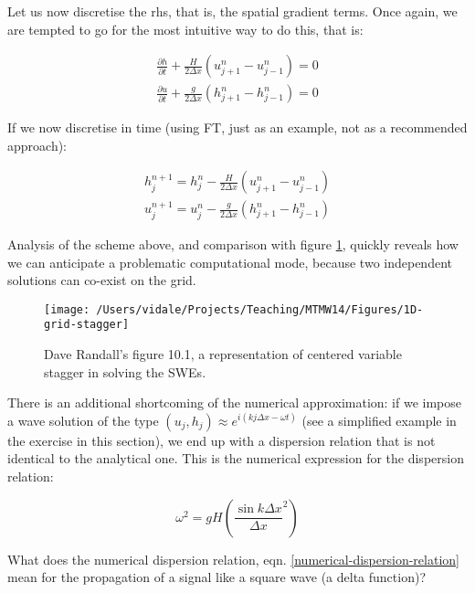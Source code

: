 Let us now discretise the rhs, that is, the spatial gradient terms. Once again, we are tempted to go for the most intuitive way to do this, that is:

\begin{eqnarray}
	\frac{\partial h}{\partial t} + \frac {H}{2 \Delta x} (u_{j+1}^n - u_{j-1}^n)= 0 \\
	\frac {\partial u}{\partial t} + \frac {g}{2 \Delta x} (h_{j+1}^n - h_{j-1}^n) = 0 \nonumber
\end{eqnarray}

If we now discretise in time (using FT, just as an example, not as a recommended approach):

\begin{eqnarray}
	h_j^{n+1}  = h_j^n  -  \frac {H}{2 \Delta x} (u_{j+1}^n - u_{j-1}^n)  \\
	u_j^{n+1}  =  u_j^n -  \frac {g}{2 \Delta x} (h_{j+1}^n - h_{j-1}^n)  \nonumber
\end{eqnarray}

Analysis of the scheme above, and comparison with figure \ref{fig:1D-grid-stagger}, quickly reveals how we can anticipate a problematic computational mode, because two independent solutions can co-exist on the grid.

\begin{figure}[h!]
	\texttt{[image: /Users/vidale/Projects/Teaching/MTMW14/Figures/1D-grid-stagger]}
	\caption{Dave Randall's figure 10.1, a representation of centered variable stagger in solving the SWEs.}
	\label{fig:1D-grid-stagger}
\end{figure}

There is an additional shortcoming of the numerical approximation: if we impose a wave solution of the type $(u_j,h_j) \approx e^{i(kj\Delta x - \omega t)}$ (see a simplified example in the exercise in this section), we end up with a dispersion relation that is not identical to the analytical one. This is the numerical expression for the dispersion relation:

\begin{equation}
	\omega^2 = gH \left(  \frac{\sin k \Delta x}{\Delta x}^2   \right)
	\label{numerical-dispersion-relation}
	\end{equation}

\begin{exercise}
What does the numerical dispersion relation, eqn. \ref{numerical-dispersion-relation} mean for the propagation of a signal like a square wave (a delta function)? 
\end{exercise}

